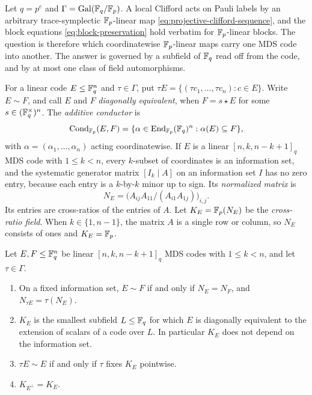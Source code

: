 Let \(q=p^e\) and \(\Gamma=\mathrm{Gal}(\mathbb F_q/\mathbb F_p)\).  A local Clifford acts
on Pauli labels by an arbitrary trace-symplectic \(\mathbb F_p\)-linear map
\eqref{eq:projective-clifford-sequence}, and the block equations
\eqref{eq:block-preservation} hold verbatim for \(\mathbb F_p\)-linear blocks.  The
question is therefore which coordinatewise \(\mathbb F_p\)-linear maps carry one MDS
code into another.  The answer is governed by a subfield of \(\mathbb F_q\) read
off from the code, and by at most one class of field automorphisms.

For a linear code \(E\leq\mathbb F_q^n\) and \(\tau\in\Gamma\), put
\(\tau E=\{(\tau c_1,\ldots,\tau c_n):c\in E\}\).  Write \(E\sim F\), and
call \(E\) and \(F\) \emph{diagonally equivalent}, when \(F=s\star E\) for
some \(s\in(\mathbb F_q^\times)^n\).  The \emph{additive conductor} is
\[
 \operatorname{Cond}_{\mathbb F_p}(E,F)=\{\alpha\in\operatorname{End}_{\mathbb F_p}(\mathbb F_q)^n:\alpha(E)\subseteq F\},
\]
with \(\alpha=(\alpha_1,\ldots,\alpha_n)\) acting coordinatewise.  If \(E\)
is a linear \([n,k,n-k+1]_q\) MDS code with \(1\leq k<n\), every
\(k\)-subset of coordinates is an information set, and the systematic
generator matrix \([I_k\mid A]\) on an information set \(I\) has no zero
entry, because each entry is a \(k\)-by-\(k\) minor up to sign.  Its
\emph{normalized matrix} is
\[
 N_E=\bigl(A_{ij}A_{11}/(A_{i1}A_{1j})\bigr)_{i,j}.
\]
Its entries are cross-ratios of the entries of \(A\).  Let
\(K_E=\mathbb F_p(N_E)\) be the \emph{cross-ratio field}.  When
\(k\in\{1,n-1\}\), the matrix \(A\) is a single row or column, so \(N_E\)
consists of ones and \(K_E=\mathbb F_p\).

\begin{lemma}
\label{lem:cross-ratio-field}
Let \(E,F\leq\mathbb F_q^n\) be linear \([n,k,n-k+1]_q\) MDS codes with
\(1\leq k<n\), and let \(\tau\in\Gamma\).
\begin{enumerate}
\item On a fixed information set, \(E\sim F\) if and only if \(N_E=N_F\),
  and \(N_{\tau E}=\tau(N_E)\).
\item \(K_E\) is the smallest subfield \(L\leq\mathbb F_q\) for which \(E\) is
  diagonally equivalent to the extension of scalars of a code over \(L\).
  In particular \(K_E\) does not depend on the information set.
\item \(\tau E\sim E\) if and only if \(\tau\) fixes \(K_E\) pointwise.
\item \(K_{E^\perp}=K_E\).
\end{enumerate}
\end{lemma}

